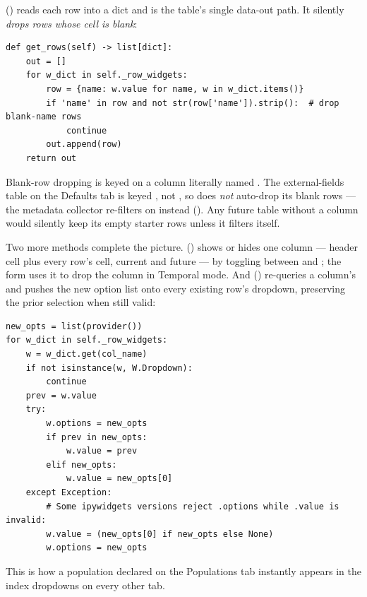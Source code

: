  () reads each row into a
 dict and is the table's single data-out path. It silently
\emph{drops rows whose  cell is blank}:

\begin{lstlisting}
def get_rows(self) -> list[dict]:
    out = []
    for w_dict in self._row_widgets:
        row = {name: w.value for name, w in w_dict.items()}
        if 'name' in row and not str(row['name']).strip():  # drop blank-name rows
            continue
        out.append(row)
    return out
\end{lstlisting}

\begin{gotcha}
Blank-row dropping is keyed on a column literally named . The
external-fields table on the Defaults tab is keyed , not ,
so  does \emph{not} auto-drop its blank rows --- the metadata
collector re-filters on  instead ().
Any future table without a  column would silently keep its empty
starter rows unless it filters itself.
\end{gotcha}

Two more methods complete the picture. 
() shows or hides one column --- header cell plus
every row's cell, current and future --- by toggling  between
 and ; the form uses it to drop the 
column in Temporal mode. And 
() re-queries a  column's
 and pushes the new option list onto every existing
row's dropdown, preserving the prior selection when still valid:

\begin{lstlisting}
new_opts = list(provider())
for w_dict in self._row_widgets:
    w = w_dict.get(col_name)
    if not isinstance(w, W.Dropdown):
        continue
    prev = w.value
    try:
        w.options = new_opts
        if prev in new_opts:
            w.value = prev
        elif new_opts:
            w.value = new_opts[0]
    except Exception:
        # Some ipywidgets versions reject .options while .value is invalid:
        w.value = (new_opts[0] if new_opts else None)
        w.options = new_opts
\end{lstlisting}

This is how a population declared on the Populations tab instantly appears in the
index dropdowns on every other tab.

